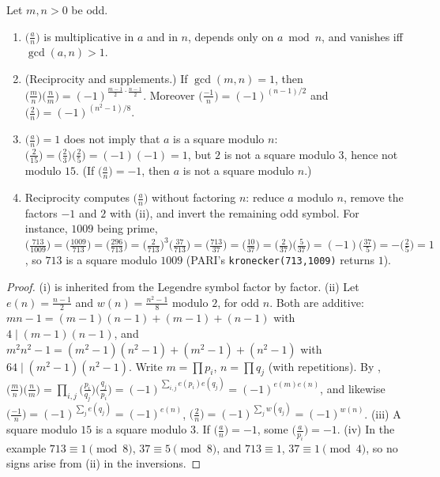 \begin{proposition}\label{prop:rings:jacobi}
Let $m,n>0$ be odd.
\begin{enumerate}[label=(\roman*)]
\item $\bigl(\frac an\bigr)$ is multiplicative in $a$ and in $n$, depends only on $a\bmod n$, and vanishes iff $\gcd(a,n)>1$.
\item (Reciprocity and supplements.) If $\gcd(m,n)=1$, then $\bigl(\frac mn\bigr)\bigl(\frac nm\bigr)=(-1)^{\frac{m-1}2\cdot\frac{n-1}2}$. Moreover
$\bigl(\frac{-1}n\bigr)=(-1)^{(n-1)/2}$ and $\bigl(\frac2n\bigr)=(-1)^{(n^2-1)/8}$.
\item $\bigl(\frac an\bigr)=1$ does not imply that $a$ is a square modulo $n$: $\bigl(\frac2{15}\bigr)=\bigl(\frac23\bigr)\bigl(\frac25\bigr)=(-1)(-1)=1$, but $2$ is not a square modulo $3$, hence
not modulo $15$. (If $\bigl(\frac an\bigr)=-1$, then $a$ is not a square modulo $n$.)
\item Reciprocity computes $\bigl(\frac an\bigr)$ without factoring $n$: reduce $a$ modulo $n$, remove the factors $-1$ and $2$ with (ii), and invert
the remaining odd symbol. For instance, $1009$ being prime,
$\bigl(\frac{713}{1009}\bigr)=\bigl(\frac{1009}{713}\bigr)=\bigl(\frac{296}{713}\bigr)=\bigl(\frac2{713}\bigr)^3\bigl(\frac{37}{713}\bigr)=\bigl(\frac{713}{37}\bigr)=\bigl(\frac{10}{37}\bigr)=\bigl(\frac2{37}\bigr)\bigl(\frac5{37}\bigr)=(-1)\bigl(\frac{37}5\bigr)=-\bigl(\frac25\bigr)=1$,
so $713$ is a square modulo $1009$ (PARI's \texttt{kronecker(713,1009)} returns $1$).
\end{enumerate}
\end{proposition}

\begin{proof}
(i) is inherited from the Legendre symbol factor by factor. (ii) Let $e(n)=\frac{n-1}2$ and $w(n)=\frac{n^2-1}8$ modulo $2$, for odd $n$. Both are additive:
$mn-1=(m-1)(n-1)+(m-1)+(n-1)$ with $4\mid(m-1)(n-1)$, and $m^2n^2-1=(m^2-1)(n^2-1)+(m^2-1)+(n^2-1)$ with $64\mid(m^2-1)(n^2-1)$. Write $m=\prod p_i$, $n=\prod q_j$
(with repetitions). By ,
$\bigl(\frac mn\bigr)\bigl(\frac nm\bigr)=\prod_{i,j}\bigl(\frac{p_i}{q_j}\bigr)\bigl(\frac{q_j}{p_i}\bigr)=(-1)^{\sum_{i,j}e(p_i)e(q_j)}=(-1)^{e(m)e(n)}$, and likewise
$\bigl(\frac{-1}n\bigr)=(-1)^{\sum_je(q_j)}=(-1)^{e(n)}$, $\bigl(\frac2n\bigr)=(-1)^{\sum_jw(q_j)}=(-1)^{w(n)}$. (iii) A square modulo $15$ is a square modulo $3$. If $\bigl(\frac an\bigr)=-1$,
some $\bigl(\frac a{p_i}\bigr)=-1$. (iv) In the example $713\equiv1\pmod8$, $37\equiv5\pmod8$, and $713\equiv1$, $37\equiv1\pmod4$, so no signs arise from (ii) in
the inversions.
\end{proof}

